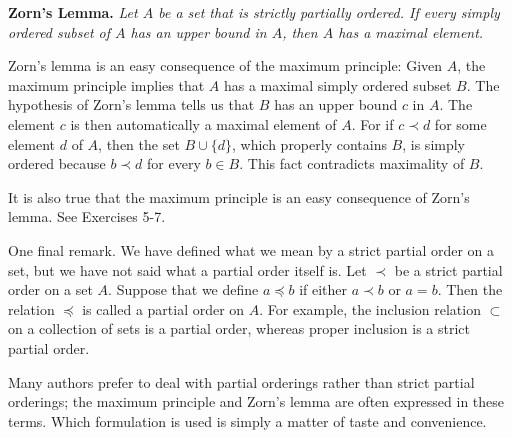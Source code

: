 \noindent\textbf{Zorn's Lemma.} \textsl{
 Let \(A\) be a set that is strictly partially ordered. 
 If every simply ordered subset of \(A\) has an upper bound in \(A\), then \(A\) has a maximal element.
}

Zorn's lemma is an easy consequence of the maximum principle: 
Given \(A\), the maximum principle implies that \(A\) has a maximal simply 
ordered subset \(B\). The hypothesis of Zorn's lemma tells us that \(B\) 
has an upper bound \(c\) in \(A\). The element \(c\) is then automatically 
a maximal element of \(A\). For if \(c \prec d\) for some element \(d\) of \(A\), 
then the set \(B \cup \{ d\}\), which properly contains \(B\), 
is simply ordered because \(b \prec d\) for every \(b \in B\). 
This fact contradicts maximality of \(B\).

It is also true that the maximum principle is an easy consequence of Zorn's lemma. 
See Exercises 5-7.

One final remark. We have defined what we mean by a strict partial order on a set, 
but we have not said what a partial order itself is. Let \(\prec\) be a strict 
partial order on a set \(A\). Suppose that we define \(a \preccurlyeq b\) 
if either \(a \prec b\) or \(a = b\). Then the relation \(\preccurlyeq\) 
is called a partial order on \(A\). For example, the inclusion relation \(\subset\) 
on a collection of sets is a partial order, 
whereas proper inclusion is a strict partial order.

Many authors prefer to deal with partial orderings rather than strict partial orderings; 
the maximum principle and Zorn's lemma are often expressed in these terms.
Which formulation is used is simply a matter of taste and convenience.

